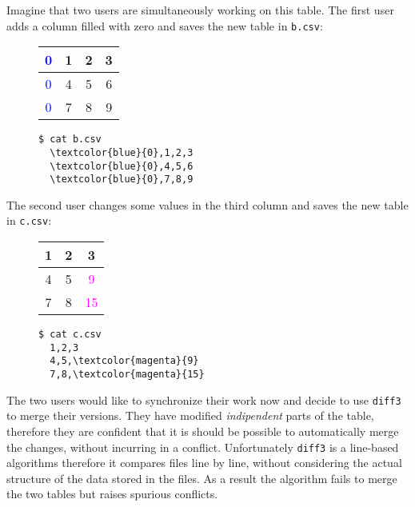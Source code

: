 \documentclass[preprint]{sigplanconf}
\begin{document}
\newpage
Imagine that two users are simultaneously working on this table.
The first user adds a column filled with zero and saves the new table in \texttt{b.csv}:
\begin{figure}[h]
\centering
\begin{minipage}{.25\textwidth}
  \centering
  \begin{tabular}{ | c | c | c | c | }
    \hline
    \textcolor{blue}{0} & 1 & 2 & 3 \\ \hline
    \textcolor{blue}{0} & 4 & 5 & 6 \\ \hline
    \textcolor{blue}{0} & 7 & 8 & 9  \\ \hline
  \end{tabular}
\end{minipage}%
\begin{minipage}{.25\textwidth}
  \centering
\begin{Verbatim}[commandchars=\\\{\}]
  $ cat b.csv
  \textcolor{blue}{0},1,2,3
  \textcolor{blue}{0},4,5,6
  \textcolor{blue}{0},7,8,9
\end{Verbatim}
\end{minipage}%
\end{figure} 

The second user changes some values in the third column and saves the new table in  \texttt{c.csv}:
\begin{figure}[h]
\centering
\begin{minipage}{.25\textwidth}
  \centering
  \begin{tabular}{ | c | c | c | }
    \hline
    1 & 2 & 3 \\ \hline
    4 & 5 & \textcolor{magenta}{9} \\ \hline
    7 & 8 & \textcolor{magenta}{15} \\ \hline
  \end{tabular}
\end{minipage}%
\begin{minipage}{.25\textwidth}
  \centering
  \begin{Verbatim}[commandchars=\\\{\}]
  $ cat c.csv
  1,2,3
  4,5,\textcolor{magenta}{9}
  7,8,\textcolor{magenta}{15}
  \end{Verbatim}
\end{minipage}%
\end{figure}

The two users would like to synchronize their work now and decide to use 
\texttt{diff3} to merge their versions. They have modified \emph{indipendent} parts of the table, therefore they are confident that it is should be possible to automatically merge the changes, without incurring in a conflict.
Unfortunately \texttt{diff3} is a line-based algorithms therefore it compares files line by line, without considering the actual structure of the data stored in the files. As a result the algorithm fails to merge the two tables but raises spurious conflicts.
\end{document}
